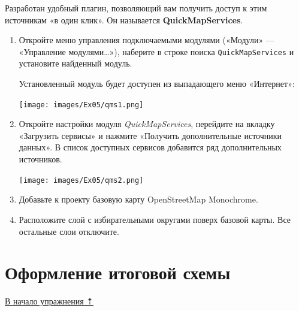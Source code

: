 \documentclass[
  12pt,
]{book}
\begin{document}
Разработан удобный плагин, позволяющий вам получить доступ к этим источникам «в один клик». Он называется \textbf{QuickMapServices}.

\begin{enumerate}
\def\labelenumi{\arabic{enumi}.}
\item
  Откройте меню управления подключаемыми модулями («Модули» --- «Управление модулями\ldots»), наберите в строке поиска \texttt{QuickMapServices} и установите найденный модуль.

  Установленный модуль будет доступен из выпадающего меню «Интернет»:

  \texttt{[image: images/Ex05/qms1.png]}
\item
  Откройте настройки модуля \emph{QuickMapServices}, перейдите на вкладку «Загрузить сервисы» и нажмите «Получить дополнительные источники данных». В список доступных сервисов добавится ряд дополнительных источников.

  \texttt{[image: images/Ex05/qms2.png]}
\item
  Добавьте к проекту базовую карту OpenStreetMap Monochrome.
\item
  Расположите слой с избирательными округами поверх базовой карты. Все остальные слои отключите.
\end{enumerate}

\hypertarget{map-ref-districts-result}{%
\section{Оформление итоговой схемы}\label{map-ref-districts-result}}

\protect\hyperlink{map-ref-districts}{В начало упражнения ⇡}
\end{document}
